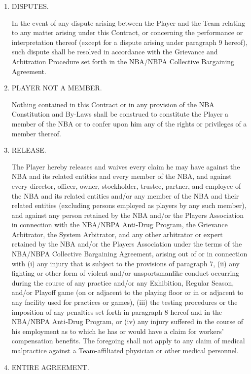 \documentclass[
]{book}
\begin{document}
\begin{enumerate}
\def\labelenumi{\arabic{enumi}.}
\setcounter{enumi}{16}
\item
  DISPUTES.

  In the event of any dispute arising between the Player and the Team relating to any matter arising under this Contract, or concerning the performance or interpretation thereof (except for a dispute arising under paragraph 9 hereof), such dispute shall be resolved in accordance with the Grievance and Arbitration Procedure set forth in the NBA/NBPA Collective Bargaining Agreement.
\item
  PLAYER NOT A MEMBER.

  Nothing contained in this Contract or in any provision of the NBA Constitution and By-Laws shall be construed to constitute the Player a member of the NBA or to confer upon him any of the rights or privileges of a member thereof.
\item
  RELEASE.

  The Player hereby releases and waives every claim he may have against the NBA and its related entities and every member of the NBA, and against every director, officer, owner, stockholder, trustee, partner, and employee of the NBA and its related entities and/or any member of the NBA and their related entities (excluding persons employed as players by any such member), and against any person retained by the NBA and/or the Players Association in connection with the NBA/NBPA Anti-Drug Program, the Grievance Arbitrator, the System Arbitrator, and any other arbitrator or expert retained by the NBA and/or the Players Association under the terms of the NBA/NBPA Collective Bargaining Agreement, arising out of or in connection with (i) any injury that is subject to the provisions of paragraph 7, (ii) any fighting or other form of violent and/or unsportsmanlike conduct occurring during the course of any practice and/or any Exhibition, Regular Season, and/or Playoff game (on or adjacent to the playing floor or in or adjacent to any facility used for practices or games), (iii) the testing procedures or the imposition of any penalties set forth in paragraph 8 hereof and in the NBA/NBPA Anti-Drug Program, or (iv) any injury suffered in the course of his employment as to which he has or would have a claim for workers' compensation benefits. The foregoing shall not apply to any claim of medical malpractice against a Team-affiliated physician or other medical personnel.
\item
  ENTIRE AGREEMENT.


\end{enumerate}
\end{document}
